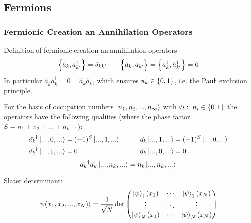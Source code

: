 	\subsection{Fermions}
		\subsubsection{Fermionic Creation an Annihilation Operators}
		\label{Sec:FermionicCreationAndAnnihilationOperators}
			Definition of fermionic creation an annihilation operators
			\begin{equation}
				\left\lbrace \hat{a}_k,\hat{a}_{k'}^\dagger \right\rbrace = \delta_{kk'}
				\hspace{20pt}
				\Big\lbrace\hat{a}_k,\hat{a}_{k'}\Big\rbrace = \left\lbrace \hat{a}_k^\dagger,\hat{a}_{k'}^\dagger \right\rbrace = 0
			\end{equation}
			In particular $\hat{a}_k^\dagger \hat{a}_k^\dagger = 0 = \hat{a}_k \hat{a}_k$, which ensures $n_k\in\left\lbrace 0,1 \right\rbrace$, i.e. the Pauli exclusion principle.

			\noindent
			For the basis of occupation numbers $\Ket{n_1, n_2, ..., n_\infty}$ with $\forall i:\;n_i\in \left\lbrace 0,1 \right\rbrace$ the operators have the following qualities (where the phase factor $S = n_1 + n_2 + ... + n_{k-1}$):
			\begin{equation}
				\begin{aligned}
					\hat{a_k}^\dagger \Ket{...,0,...} &= (-1)^S \Ket{...,1,...}
					&\hspace{20pt}
					\hat{a_k} \Ket{...,1,...} &= (-1)^S \Ket{...,0,...}
					\\
					\hat{a_k}^\dagger \Ket{...,1,...} &= 0
					&\hspace{20pt}
					\hat{a_k} \Ket{...,0,...} &= 0
				\end{aligned}
			\end{equation}
			\begin{equation}
				\hat{a_k}^\dagger \hat{a_k} \Ket{...,n_k,...} = n_k \Ket{...,n_k,...}
			\end{equation}

			\noindent
			Slater determinant:
			\begin{equation}
				\Ket{\psi(x_1,x_2,...,x_N)} = \frac{1}{\sqrt{N}} \det\left( \begin{matrix}
					\Ket{\psi}_1(x_1) & \dotsb & \Ket{\psi}_1(x_N) \\
					\vdots & \ddots & \vdots \\
					\Ket{\psi}_N(x_1) & \dotsb & \Ket{\psi}_N(x_N) \\
				\end{matrix} \right)
			\end{equation}



